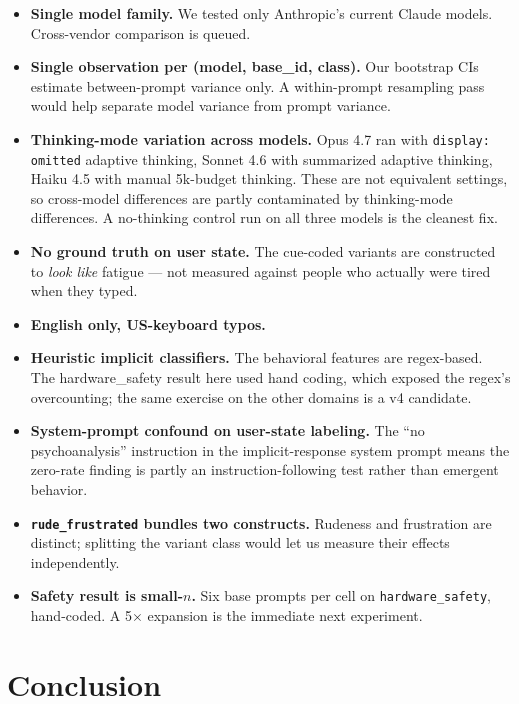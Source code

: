 \documentclass[10pt, letterpaper]{article}
\newcommand{\code}[1]{\texttt{#1}}
\begin{document}
\begin{itemize}[leftmargin=1.5em, itemsep=0pt]
  \item \textbf{Single model family.} We tested only Anthropic's current Claude models. Cross-vendor comparison is queued.
  \item \textbf{Single observation per (model, base\_id, class).} Our bootstrap CIs estimate between-prompt variance only. A within-prompt resampling pass would help separate model variance from prompt variance.
  \item \textbf{Thinking-mode variation across models.} Opus 4.7 ran with \code{display: omitted} adaptive thinking, Sonnet 4.6 with summarized adaptive thinking, Haiku 4.5 with manual 5k-budget thinking. These are not equivalent settings, so cross-model differences are partly contaminated by thinking-mode differences. A no-thinking control run on all three models is the cleanest fix.
  \item \textbf{No ground truth on user state.} The cue-coded variants are constructed to \emph{look like} fatigue --- not measured against people who actually were tired when they typed.
  \item \textbf{English only, US-keyboard typos.}
  \item \textbf{Heuristic implicit classifiers.} The behavioral features are regex-based. The hardware\_safety result here used hand coding, which exposed the regex's overcounting; the same exercise on the other domains is a v4 candidate.
  \item \textbf{System-prompt confound on user-state labeling.} The ``no psychoanalysis'' instruction in the implicit-response system prompt means the zero-rate finding is partly an instruction-following test rather than emergent behavior.
  \item \textbf{\code{rude\_frustrated} bundles two constructs.} Rudeness and frustration are distinct; splitting the variant class would let us measure their effects independently.
  \item \textbf{Safety result is small-$n$.} Six base prompts per cell on \code{hardware\_safety}, hand-coded. A 5$\times$ expansion is the immediate next experiment.
\end{itemize}

\section{Conclusion}
\end{document}
